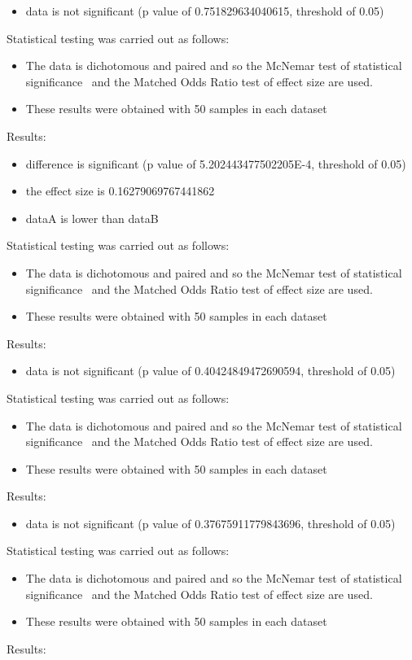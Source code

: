 \documentclass[]{article}
\begin{document}
\begin{itemize}
\item{data is not significant (p value of 0.751829634040615, threshold of 0.05)}
\end{itemize}Statistical testing was carried out as follows: \begin{itemize}
\item{The data is dichotomous and paired and so the McNemar test of statistical significance~\cite{Gibbons2011} and the Matched Odds Ratio test of effect size are used.}
\item{These results were obtained with 50 samples in each dataset}
\end{itemize}Results:
\begin{itemize}
\item{difference is significant (p value of 5.202443477502205E-4, threshold of 0.05)}
\item{the effect size is 0.16279069767441862}
\item{dataA is lower than dataB}
\end{itemize}Statistical testing was carried out as follows: \begin{itemize}
\item{The data is dichotomous and paired and so the McNemar test of statistical significance~\cite{Gibbons2011} and the Matched Odds Ratio test of effect size are used.}
\item{These results were obtained with 50 samples in each dataset}
\end{itemize}Results:
\begin{itemize}
\item{data is not significant (p value of 0.40424849472690594, threshold of 0.05)}
\end{itemize}Statistical testing was carried out as follows: \begin{itemize}
\item{The data is dichotomous and paired and so the McNemar test of statistical significance~\cite{Gibbons2011} and the Matched Odds Ratio test of effect size are used.}
\item{These results were obtained with 50 samples in each dataset}
\end{itemize}Results:
\begin{itemize}
\item{data is not significant (p value of 0.37675911779843696, threshold of 0.05)}
\end{itemize}Statistical testing was carried out as follows: \begin{itemize}
\item{The data is dichotomous and paired and so the McNemar test of statistical significance~\cite{Gibbons2011} and the Matched Odds Ratio test of effect size are used.}
\item{These results were obtained with 50 samples in each dataset}
\end{itemize}Results:
\end{document}
